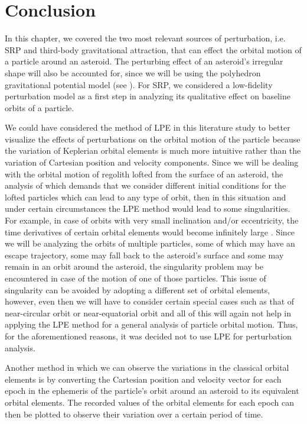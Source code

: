 \section{Conclusion}
In this chapter, we covered the two most relevant sources of perturbation, i.e. \gls{SRP} and third-body gravitational attraction, that can effect the orbital motion of a particle around an asteroid. The perturbing effect of an asteroid's irregular shape will also be accounted for, since we will be using the polyhedron gravitational potential model (see ). For \gls{SRP}, we considered a low-fidelity perturbation model as a first step in analyzing its qualitative effect on baseline orbits of a particle.

We could have considered the method of \gls{LPE} in this literature study to better visualize the effects of perturbations on the orbital motion of the particle because the variation of Keplerian orbital elements is much more intuitive rather than the variation of Cartesian position and velocity components. Since we will be dealing with the orbital motion of regolith lofted from the surface of an asteroid, the analysis of which demands that we consider different initial conditions for the lofted particles which can lead to any type of orbit, then in this situation and under certain circumstances the \gls{LPE} method would lead to some singularities. For example, in case of orbits with very small inclination and/or eccentricity, the time derivatives of certain orbital elements would become infinitely large \cite{wakker}. Since we will be analyzing the orbits of multiple particles, some of which may have an escape trajectory, some may fall back to the asteroid's surface and some may remain in an orbit around the asteroid, the singularity problem may be encountered in case of the motion of one of those particles. This issue of singularity can be avoided by adopting a different set of orbital elements, however, even then we will have to consider certain special cases such as that of near-circular orbit or near-equatorial orbit and all of this will again not help in applying the \gls{LPE} method for a general analysis of particle orbital motion. Thus, for the aforementioned reasons, it was decided not to use \gls{LPE} for perturbation analysis.

Another method in which we can observe the variations in the classical orbital elements is by converting the Cartesian position and velocity vector for each epoch in the ephemeris of the particle's orbit around an asteroid to its equivalent orbital elements. The recorded values of the orbital elements for each epoch can then be plotted to observe their variation over a certain period of time.

